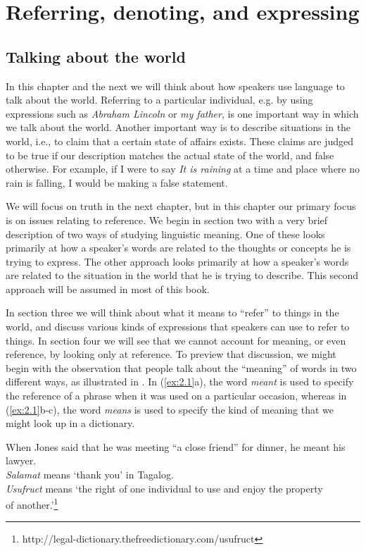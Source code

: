 \chapter{Referring, denoting, and expressing}\label{sec:2}

\section{Talking about the world}\label{sec:2.1}

In this chapter and the next we will think about how speakers use language to talk about the world. Referring to a particular individual, e.g. by using expressions such as \textit{Abraham Lincoln} or \textit{my father}, is one important way in which we talk about the world. Another important way is to describe situations in the world, i.e., to claim that a certain state of affairs exists. These claims are judged to be true if our description matches the actual state of the world, and false otherwise. For example, if I were to say \textit{It is raining} at a time and place where no rain is falling, I would be making a false statement.



We will focus on truth in the next chapter, but in this chapter our primary focus is on issues relating to reference. We begin in section two with a very brief description of two ways of studying linguistic meaning. One of these looks primarily at how a speaker’s words are related to the thoughts or concepts he is trying to express. The other approach looks primarily at how a speaker’s words are related to the situation in the world that he is trying to describe. This second approach will be assumed in most of this book.



In section three we will think about what it means to “refer” to things in the world, and discuss various kinds of expressions that speakers can use to refer to things. In section four we will see that we cannot account for meaning, or even reference, by looking only at reference. To preview that discussion, we might begin with the observation that people talk about the “meaning” of words in two different ways, as illustrated in . In (\ref{ex:2.1}a), the word \textit{meant} is used to specify the reference of a phrase when it was used on a particular occasion, whereas in (\ref{ex:2.1}b-c), the word \textit{means} is used to specify the kind of meaning that we might look up in a dictionary.


\ea \label{ex:2.1}
\ea When Jones said that he was meeting “a close friend” for dinner, he meant his lawyer.\\
\ex \textit{Salamat} means ‘thank you’ in Tagalog.\\
\ex \textit{Usufruct} means ‘the right of one individual to use and enjoy the property\\
  of another.’\footnote{http://legal-dictionary.thefreedictionary.com/usufruct}
\z
\z


